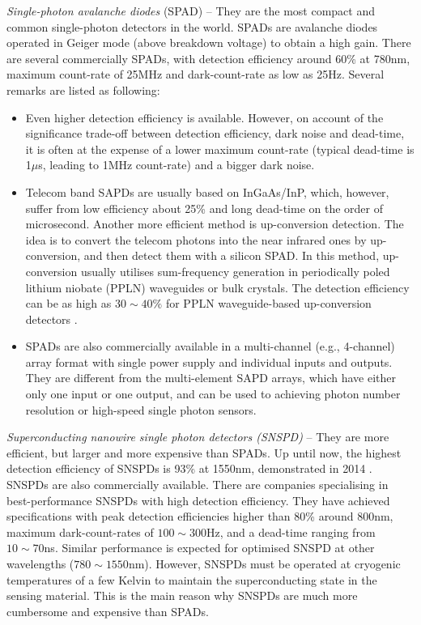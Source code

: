 \documentclass[aps, rmp, twocolumn, amsmath, amssymb, nofootinbib, superscriptaddress, longbibliography, floatfix, table-of-contents, eqsecnum]{revtex4-1}
\begin{document}
\textit{Single-photon avalanche diodes} (SPAD) -- They are the most compact and common single-photon detectors in the world. SPADs are avalanche diodes operated in Geiger mode (above breakdown voltage) to obtain a high gain. There are several commercially SPADs, with detection efficiency around 60\% at 780nm, maximum count-rate of 25MHz and dark-count-rate as low as 25Hz. Several remarks are listed as following:

\begin{itemize}
    \item Even higher detection efficiency is available. However, on account of the significance trade-off between detection efficiency, dark noise and dead-time, it is often at the expense of a lower maximum count-rate (typical dead-time is 1$\mu$s, leading to 1MHz count-rate) and a bigger dark noise.

    \item Telecom band SAPDs are usually based on InGaAs/InP, which, however, suffer from low efficiency about 25\% and long dead-time on the order of microsecond. Another more efficient method is up-conversion detection. The idea is to convert the telecom photons into the near infrared ones by up-conversion, and then detect them with a silicon SPAD. In this method, up-conversion usually utilises sum-frequency generation in periodically poled lithium niobate (PPLN) waveguides or bulk crystals. The detection efficiency can be as high as \mbox{$30\sim 40\%$} for PPLN waveguide-based up-conversion detectors \cite{shentu2013ultralow}.
    \item SPADs are also commercially available in a multi-channel (e.g., 4-channel) array format with single power supply and individual inputs and outputs. They are different from the multi-element SAPD arrays, which have either only one input or one output, and can be used to achieving photon number resolution or high-speed single photon sensors.
\end{itemize}

\textit{Superconducting nanowire single photon detectors (SNSPD)} -- They are more efficient, but larger and more expensive than SPADs. Up until now, the highest detection efficiency of SNSPDs is 93\% at 1550nm, demonstrated in 2014 \cite{marsili2013}. SNSPDs are also commercially available. There are companies specialising in best-performance SNSPDs with high detection efficiency. They have achieved specifications with peak detection efficiencies higher than 80\% around 800nm, maximum dark-count-rates of \mbox{$100\sim 300$Hz}, and a dead-time ranging from \mbox{$10\sim 70$ns}. Similar performance is expected for optimised SNSPD at other wavelengths (\mbox{$780\sim 1550$nm}). However, SNSPDs must be operated at cryogenic temperatures of a few Kelvin to maintain the superconducting state in the sensing material. This is the main reason why SNSPDs are much more cumbersome and expensive than SPADs.
\end{document}
